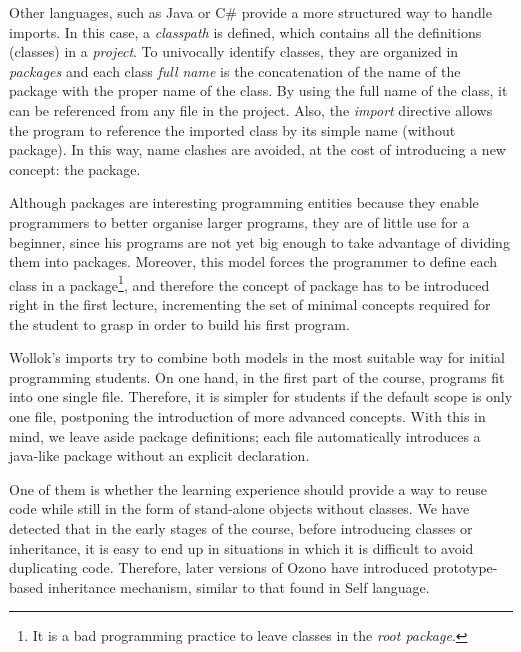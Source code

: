 Other languages, such as Java or C\# provide a more structured way to handle imports. 
In this case, a \emph{classpath} is defined, which contains all the definitions (\ie classes) in a \emph{project}.
To univocally identify classes, they are organized in \emph{packages} and each class \emph{full name} is the concatenation of the name of the package with the proper name of the class.
By using the full name of the class, it can be referenced from any file in the project.
Also, the \emph{import} directive allows the program to reference the imported class by its simple name (without package).
In this way, name clashes are avoided, at the cost of introducing a new concept: the package.

Although packages are interesting programming entities because they enable programmers to better organise larger programs, 
they are of little use for a beginner, since his programs are not yet big enough to take advantage of dividing them into packages.
Moreover, this model forces the programmer to define each class in a package\footnote{It is a bad programming practice to leave classes in the \emph{root package}.}, 
and therefore the concept of package has to be introduced right in the first lecture, 
incrementing the set of minimal concepts required for the student to grasp in order to build his first program.

\medskip

Wollok's imports try to combine both models in the most suitable way for initial programming students.
On one hand, in the first part of the course, programs fit into one single file. 
Therefore, it is simpler for students if the default scope is only one file, postponing the introduction of more advanced concepts.
With this in mind, we leave aside package definitions; each file automatically introduces a java-like package without an explicit declaration.


\bigskip
One of them is whether the learning experience should provide a way to reuse
code while still in the form of stand-alone objects without classes.
We have detected that in the early stages of the course, before introducing classes or inheritance, 
it is easy to end up in situations in which it is difficult to avoid duplicating code.
Therefore, later versions of Ozono have introduced prototype-based inheritance mechanism, 
similar to that found in Self language\cite{Ungar87self:the, Ungar91organizingprograms}. 

